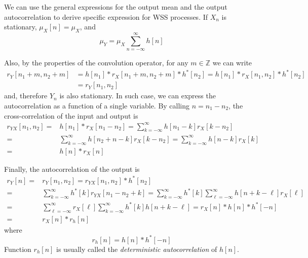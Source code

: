 We can use the general expressions for the output mean and the output autocorrelation to derive specific expression for  WSS processes. If $X_n$ is stationary, $\mu_X[n]=\mu_X$, and
\begin{equation}
  \mu_Y = \mu_X \sum_{n=-\infty}^{\infty} h[n]
  \label{mediaout_stationary}
\end{equation}

Also, by the properties of the convolution operator, for any $m\in \mathbb{Z}$ we can write
\begin{align}
r_Y[n_1 + m, n_2 + m]
	&= h[n_1]*r_X[n_1 + m, n_2 + m]*h^*[n_2]
	 = h[n_1]*r_X[n_1, n_2]*h^*[n_2]  \nonumber\\
	&= r_Y[n_1, n_2]
\end{align}
and, therefore $Y_n$ is also stationary. In such case, we can express the autocorrelation as a function of a single variable. By calling $n=n_1-n_2$, the cross-correlation of the input and output is
\begin{align}
r_{YX}[n_1, n_2] 
    =& h[n_1] \ast r_X[n_1 - n_2]
    =  \sum_{k=-\infty}^{\infty} h[n_1 - k] r_X[k - n_2]  \nonumber \\
    =& \sum_{k=-\infty}^{\infty} h[n_2 + n - k] r_X[k - n_2]
    =  \sum_{k=-\infty}^{\infty} h[n - k] r_X[k] \nonumber \\
    =& h[n] \ast r_X[n]
  \label{RvuStationary}
\end{align}

Finally, the autocorrelation of the output is
\begin{align}
r_Y[n] 
	=& r_Y[n_1, n_2] = r_{YX}[n_1, n_2] \ast h^*[n_2]   \nonumber \\
  	=& \sum_{k=-\infty}^{\infty} h^*[k] r_{YX}[n_1-n_2+k]  
  	=  \sum_{k=-\infty}^{\infty} h^*[k]
  	   \sum_{\ell=-\infty}^{\infty} h[n+k-\ell] r_X[\ell] \nonumber \\
    =& \sum_{\ell=-\infty}^{\infty} r_X[\ell]
       \sum_{k=-\infty}^{\infty} h^*[k] h[n + k - \ell] 
  	=  r_X[n]*h[n]*h^*[-n] \nonumber \\
  	=& r_X[n]*r_h[n]
  \label{RvvStationary}
\end{align}
where 
\begin{equation}
r_h[n]=h[n]*h^*[-n]
\end{equation}
Function $r_h[n]$ is usually called the \emph{deterministic autocorrelation} of $h[n]$.

